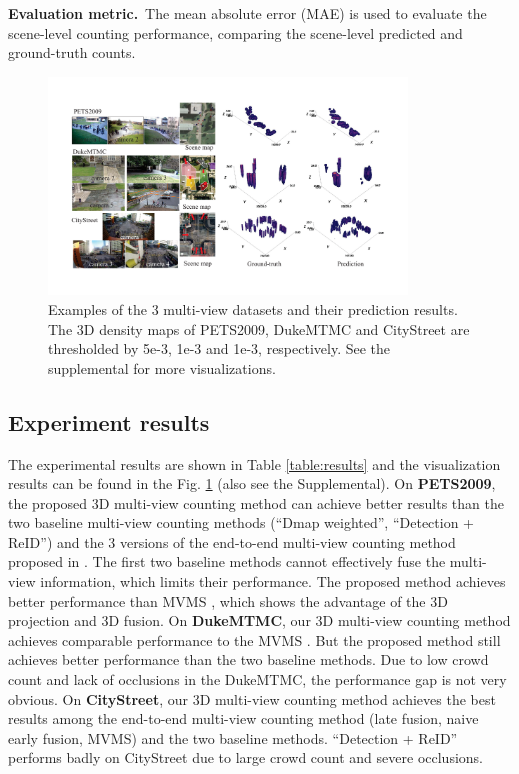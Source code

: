 \documentclass[letterpaper]{article}
\newcommand{\citep}{\cite}
\newcommand{\citealp}[1]{\citeauthor{#1} \citeyear{#1}}
\begin{document}
\textbf{Evaluation metric.}~The mean absolute error (MAE) is used to evaluate the scene-level counting performance, comparing the scene-level predicted and ground-truth counts.


\begin{figure}[t]
\centering
   \includegraphics[width=0.85\textwidth]{Fig_results.pdf}
   \caption{Examples of the 3 multi-view datasets and their prediction results.
   The 3D density maps of PETS2009, DukeMTMC and CityStreet are thresholded by 5e-3, 1e-3 and 1e-3, respectively.
   See the supplemental for more visualizations.}
\label{fig:results}
\end{figure}




\subsection{Experiment results}

The experimental results are shown in Table \ref{table:results} and the visualization results can be found in the Fig. \ref{fig:results} (also see the Supplemental). On \textbf{PETS2009}, the proposed 3D multi-view counting method can achieve better results than the two baseline multi-view counting methods (``Dmap weighted'', ``Detection + ReID'') and the 3 versions of the end-to-end multi-view counting method proposed in \citealp{zhang2019wide}. The first two baseline methods cannot effectively fuse the multi-view information, which limits their performance. The proposed method achieves better performance than MVMS \citep{zhang2019wide}, which shows the advantage of the 3D projection and 3D fusion.
On \textbf{DukeMTMC}, our 3D multi-view counting method achieves comparable performance to the MVMS \citep{zhang2019wide}. But the proposed method still achieves better performance than the two baseline methods. Due to low crowd count and lack of occlusions in the DukeMTMC, the performance gap is not very obvious. On \textbf{CityStreet}, our 3D multi-view counting method achieves the best results among the end-to-end multi-view counting method (late fusion, naive early fusion, MVMS) and the two baseline methods. ``Detection + ReID'' performs badly on CityStreet due to large crowd count and severe occlusions.
\end{document}
